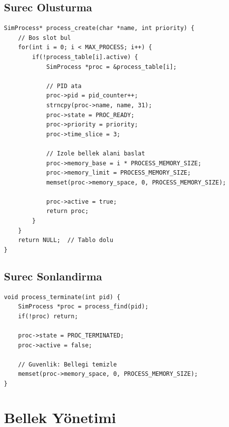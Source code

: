 \documentclass[12pt,a4paper]{report}
\begin{document}
\section{Surec Olusturma}

\begin{lstlisting}[caption={process\_create Fonksiyonu}]
SimProcess* process_create(char *name, int priority) {
    // Bos slot bul
    for(int i = 0; i < MAX_PROCESS; i++) {
        if(!process_table[i].active) {
            SimProcess *proc = &process_table[i];
            
            // PID ata
            proc->pid = pid_counter++;
            strncpy(proc->name, name, 31);
            proc->state = PROC_READY;
            proc->priority = priority;
            proc->time_slice = 3;
            
            // Izole bellek alani baslat
            proc->memory_base = i * PROCESS_MEMORY_SIZE;
            proc->memory_limit = PROCESS_MEMORY_SIZE;
            memset(proc->memory_space, 0, PROCESS_MEMORY_SIZE);
            
            proc->active = true;
            return proc;
        }
    }
    return NULL;  // Tablo dolu
}
\end{lstlisting}

\section{Surec Sonlandirma}

\begin{lstlisting}[caption={process\_terminate Fonksiyonu}]
void process_terminate(int pid) {
    SimProcess *proc = process_find(pid);
    if(!proc) return;
    
    proc->state = PROC_TERMINATED;
    proc->active = false;
    
    // Guvenlik: Bellegi temizle
    memset(proc->memory_space, 0, PROCESS_MEMORY_SIZE);
}
\end{lstlisting}

\chapter{Bellek Yönetimi}
\end{document}
